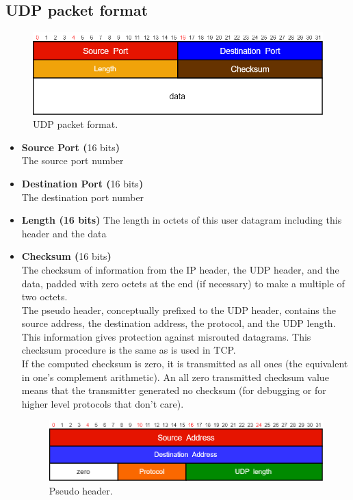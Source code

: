 \subsection{UDP packet format}
\begin{figure}[h]
\centering\footnotesize
\includegraphics[scale=0.5]{Images/Transport/UDP_packet_format}
\caption{UDP packet format.}
\end{figure}
\begin{itemize}
\item{\textbf{Source Port (}16 bits\textbf{)}\\
The source port number}
\item{\textbf{Destination Port (}16 bits\textbf{)}\\
The destination port number}
\item{\textbf{Length (16 bits)}
The length in octets of this user datagram including this header and the data}
\item{\textbf{Checksum (}16 bits\textbf{)}\\
The checksum of information from the IP header, the UDP header, and the data, padded with zero octets at the end (if necessary) to make a multiple of two octets.\\
The pseudo header, conceptually prefixed to the UDP header, contains the source  address,  the destination  address,  the protocol,  and the  UDP length.   This information gives protection against misrouted datagrams. This checksum procedure is the same as is used in TCP.\\
If the computed checksum is zero, it is transmitted as all ones (the equivalent in one's complement arithmetic). An all zero transmitted
checksum value means that the transmitter generated no checksum (for debugging or for higher level protocols that don't care).
\begin{figure}[H]
\centering\footnotesize
\includegraphics[scale=0.5]{Images/Transport/UDP_pseudo_header}
\caption{Pseudo header.}
\end{figure}
}
\end{itemize}


